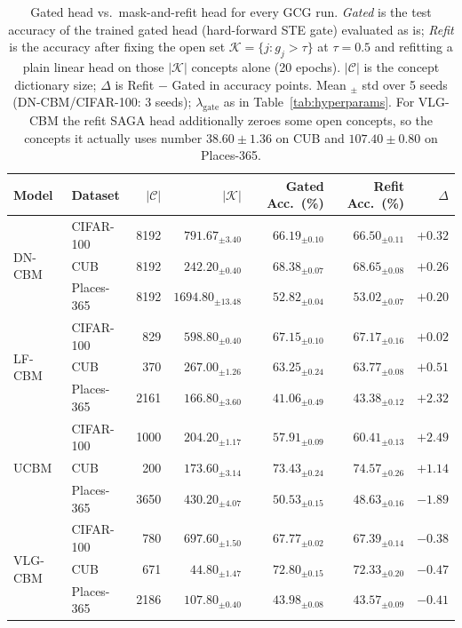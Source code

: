 \begin{table}[t]
\centering
\small
\setlength{\tabcolsep}{4pt}
\begin{tabular}{llrrrrr}
\toprule
\textbf{Model} & \textbf{Dataset} & $|\mathcal{C}|$ & $|\mathcal{K}|$ &
\textbf{Gated Acc.\ (\%)} & \textbf{Refit Acc.\ (\%)} & $\Delta$ \\
\midrule
\multirow{3}{*}{DN-CBM} & CIFAR-100 & 8192 & $791.67_{\pm 3.40}$ & $66.19_{\pm 0.10}$ & $66.50_{\pm 0.11}$ & $+0.32$ \\
 & CUB & 8192 & $242.20_{\pm 0.40}$ & $68.38_{\pm 0.07}$ & $68.65_{\pm 0.08}$ & $+0.26$ \\
 & Places-365 & 8192 & $1694.80_{\pm 13.48}$ & $52.82_{\pm 0.04}$ & $53.02_{\pm 0.07}$ & $+0.20$ \\
\midrule
\multirow{3}{*}{LF-CBM} & CIFAR-100 & 829 & $598.80_{\pm 0.40}$ & $67.15_{\pm 0.10}$ & $67.17_{\pm 0.16}$ & $+0.02$ \\
 & CUB & 370 & $267.00_{\pm 1.26}$ & $63.25_{\pm 0.24}$ & $63.77_{\pm 0.08}$ & $+0.51$ \\
 & Places-365 & 2161 & $166.80_{\pm 3.60}$ & $41.06_{\pm 0.49}$ & $43.38_{\pm 0.12}$ & $+2.32$ \\
\midrule
\multirow{3}{*}{UCBM} & CIFAR-100 & 1000 & $204.20_{\pm 1.17}$ & $57.91_{\pm 0.09}$ & $60.41_{\pm 0.13}$ & $+2.49$ \\
 & CUB & 200 & $173.60_{\pm 3.14}$ & $73.43_{\pm 0.24}$ & $74.57_{\pm 0.26}$ & $+1.14$ \\
 & Places-365 & 3650 & $430.20_{\pm 4.07}$ & $50.53_{\pm 0.15}$ & $48.63_{\pm 0.16}$ & $-1.89$ \\
\midrule
\multirow{3}{*}{VLG-CBM} & CIFAR-100 & 780 & $697.60_{\pm 1.50}$ & $67.77_{\pm 0.02}$ & $67.39_{\pm 0.14}$ & $-0.38$ \\
 & CUB & 671 & $44.80_{\pm 1.47}$ & $72.80_{\pm 0.15}$ & $72.33_{\pm 0.20}$ & $-0.47$ \\
 & Places-365 & 2186 & $107.80_{\pm 0.40}$ & $43.98_{\pm 0.08}$ & $43.57_{\pm 0.09}$ & $-0.41$ \\
\bottomrule
\end{tabular}
\caption{Gated head vs.\ mask-and-refit head for every GCG run. \emph{Gated} is
the test accuracy of the trained gated head (hard-forward STE gate) evaluated as
is; \emph{Refit} is the accuracy after fixing the open set
$\mathcal{K} = \{j : g_j > \tau\}$ at $\tau = 0.5$ and refitting a plain linear
head on those $|\mathcal{K}|$ concepts alone (20 epochs). $|\mathcal{C}|$ is the
concept dictionary size; $\Delta$ is Refit $-$ Gated in accuracy points. Mean
$_{\pm}$ std over 5 seeds (DN-CBM/CIFAR-100: 3 seeds);
$\lambda_{\text{gate}}$ as in Table~\ref{tab:hyperparams}. For VLG-CBM the refit
SAGA head additionally zeroes some open concepts, so the concepts it actually
uses number $38.60 \pm 1.36$ on CUB and $107.40 \pm 0.80$ on Places-365.}
\label{tab:gated_vs_refit}
\end{table}
